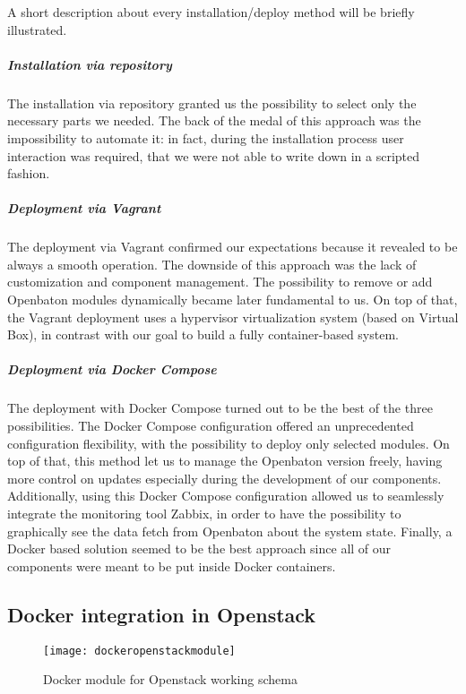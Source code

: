 A short description about every installation/deploy method will be briefly
illustrated.

\subparagraph*{Installation via repository}
The installation via repository granted us the possibility to select only the
necessary parts we needed. The back of the medal of this approach was the
impossibility to automate it: in fact, during the installation process user
interaction was required, that we were not able to write down in a scripted
fashion.

\subparagraph*{Deployment via Vagrant}
The deployment via Vagrant confirmed our expectations because it revealed to be
always a smooth operation. The downside of this approach was the lack of
customization and component management. The possibility to remove or add
Openbaton modules dynamically became later fundamental to us. On top of that,
the Vagrant deployment uses a hypervisor virtualization system (based on Virtual
Box), in contrast with our goal to build a fully container-based system.

\subparagraph*{Deployment via Docker Compose}
The deployment with Docker Compose turned out to be the best of the three
possibilities. The Docker Compose configuration offered an unprecedented
configuration flexibility, with the possibility to deploy only selected modules.
On top of that, this method let us to manage the Openbaton version freely,
having more control on updates especially during the development of our
components. Additionally, using this Docker Compose configuration allowed us to
seamlessly integrate the monitoring tool Zabbix, in order to have the
possibility to graphically see the data fetch from Openbaton about the system
state. Finally, a Docker based solution seemed to be the best approach since all
of our components were meant to be put inside Docker containers.

\subsection{Docker integration in Openstack}

\begin{figure}[t]
  \centering
  \texttt{[image: dockeropenstackmodule]}
  \caption[Docker module for Openstack working schema]{Docker module for
    Openstack working schema~\cite{openstackDockerModule}}
  \label{chap:archimpl:sec:fistattempt:img:dockeropnestackmodule}
\end{figure}

